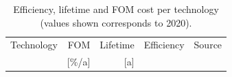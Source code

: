 \documentclass[3p]{elsarticle} %
\def\co{CO${}_2$}
\def\el{${}_{\textrm{el}}$}
\def\th{${}_{\textrm{th}}$}
\begin{document}
\begin{table}
\centering
\begin{threeparttable}
\caption{Efficiency, lifetime and FOM cost per technology (values shown corresponds to 2020).} \label{tab:inputs}
\centering
\begin{tabularx}{0.8\textwidth}{lrrrr}
\toprule
Technology & FOM\tnote{a} & Lifetime & Efficiency & Source\\
 & [\%/a] & [a] &  & \\
\midrule



\end{tabularx}
\end{threeparttable}
\end{table}
\end{document}

